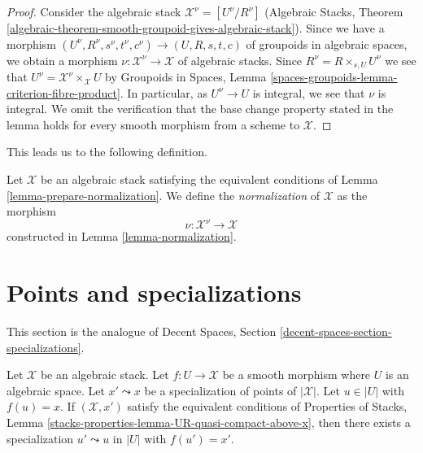 \begin{proof}
\medskip\noindent
Consider the algebraic stack $\mathcal{X}^\nu = [U^\nu/R^\nu]$
(Algebraic Stacks, Theorem
\ref{algebraic-theorem-smooth-groupoid-gives-algebraic-stack}).
Since we have a morphism
$(U^\nu, R^\nu, s^\nu, t^\nu, c^\nu) \to (U, R, s, t, c)$
of groupoids in algebraic spaces, we obtain a morphism
$\nu : \mathcal{X}^\nu \to \mathcal{X}$ of algebraic stacks.
Since $R^\nu = R \times_{s, U} U^\nu$ we see that
$U^\nu = \mathcal{X}^\nu \times_\mathcal{X} U$ by
Groupoids in Spaces, Lemma
\ref{spaces-groupoids-lemma-criterion-fibre-product}.
In particular, as $U^\nu \to U$ is integral, we see that $\nu$ is integral.
We omit the verification that the base change property
stated in the lemma holds for every smooth morphism from a scheme to
$\mathcal{X}$.
\end{proof}

\noindent
This leads us to the following definition.

\begin{definition}
\label{definition-normalization}
Let $\mathcal{X}$ be an algebraic stack satisfying the
equivalent conditions of Lemma \ref{lemma-prepare-normalization}.
We define the {\it normalization} of $\mathcal{X}$ as the morphism
$$
\nu : \mathcal{X}^\nu \longrightarrow \mathcal{X}
$$
constructed in Lemma \ref{lemma-normalization}.
\end{definition}










\section{Points and specializations}
\label{section-specializations}

\noindent
This section is the analogue of
Decent Spaces, Section \ref{decent-spaces-section-specializations}.

\begin{lemma}
\label{lemma-specialization}
Let $\mathcal{X}$ be an algebraic stack. Let $f : U \to \mathcal{X}$
be a smooth morphism where $U$ is an algebraic space. Let
$x' \leadsto x$ be a specialization of points of $|\mathcal{X}|$.
Let $u \in |U|$ with $f(u) = x$. If $(\mathcal{X}, x')$ satisfy the
equivalent conditions of Properties of Stacks,
Lemma \ref{stacks-properties-lemma-UR-quasi-compact-above-x},
then there exists a specialization
$u' \leadsto u$ in $|U|$ with $f(u') = x'$.
\end{lemma}

